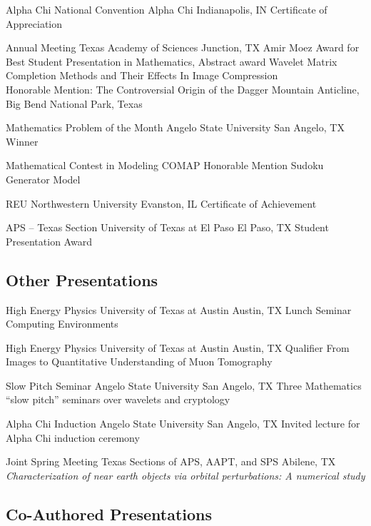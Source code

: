 \documentclass[10pt,letterpaper,english]{moderncv}
\begin{document}
{Alpha Chi National Convention}
{Alpha Chi}
{Indianapolis, IN}
{Certificate of Appreciation}

{Annual Meeting}
{Texas Academy of Sciences}
{Junction, TX}
{Amir Moez Award for Best Student Presentation in Mathematics, Abstract award}%
{Wavelet Matrix Completion Methods and Their Effects In Image Compression\\
\textnormal{Honorable Mention:}
The Controversial Origin of the Dagger Mountain Anticline, Big Bend National Park, Texas}


{Mathematics Problem of the Month}
{Angelo State University}
{San Angelo, TX}
{Winner}

{Mathematical Contest in Modeling}
{COMAP}
{}
{Honorable Mention}%
{Sudoku Generator Model}

{REU}
{Northwestern University}
{Evanston, IL}
{Certificate of Achievement}

{APS -- Texas Section}
{University of Texas at El Paso}
{El Paso, TX}
{Student Presentation Award}


\subsection{Other Presentations}
{High Energy Physics}
{University of Texas at Austin}
{Austin, TX}
{Lunch Seminar}%
{Computing Environments}

{High Energy Physics}
{University of Texas at Austin}
{Austin, TX}
{Qualifier}%
{From Images to Quantitative Understanding of Muon Tomography}

{Slow Pitch Seminar}
{Angelo State University}
{San Angelo, TX}
{Three Mathematics ``slow pitch'' seminars over wavelets and cryptology}

{Alpha Chi Induction}
{Angelo State University}
{San Angelo, TX}
{Invited lecture for Alpha Chi induction ceremony}

{Joint Spring Meeting}
{Texas Sections of APS, AAPT, and SPS}
{Abilene, TX}
{\emph{Characterization of near earth objects via orbital perturbations: A numerical study}} %


\subsection{Co-Authored Presentations}
\end{document}
